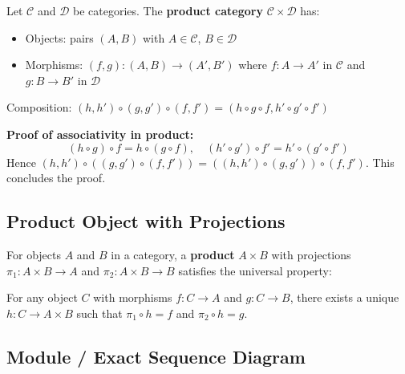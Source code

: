 \documentclass{article}
\begin{document}
Let $\mathcal{C}$ and $\mathcal{D}$ be categories. The \textbf{product category} $\mathcal{C} \times \mathcal{D}$ has:
\begin{itemize}
    \item Objects: pairs $(A, B)$ with $A \in \mathcal{C}$, $B \in \mathcal{D}$
    \item Morphisms: $(f, g) : (A, B) \to (A', B')$ where $f : A \to A'$ in $\mathcal{C}$ and $g : B \to B'$ in $\mathcal{D}$
\end{itemize}

Composition: $(h, h') \circ (g, g') \circ (f, f') = (h \circ g \circ f, h' \circ g' \circ f')$

\begin{center}
\end{center}

\textbf{Proof of associativity in product:}
\[
(h \circ g) \circ f = h \circ (g \circ f), \quad (h' \circ g') \circ f' = h' \circ (g' \circ f')
\]
Hence $(h, h') \circ ((g, g') \circ (f, f')) = ((h, h') \circ (g, g')) \circ (f, f')$. This concludes the proof.

\subsection{Product Object with Projections}

For objects $A$ and $B$ in a category, a \textbf{product} $A \times B$ with projections $\pi_1 : A \times B \to A$ and $\pi_2 : A \times B \to B$ satisfies the universal property:

\begin{center}
\end{center}

For any object $C$ with morphisms $f : C \to A$ and $g : C \to B$, there exists a unique $h : C \to A \times B$ such that $\pi_1 \circ h = f$ and $\pi_2 \circ h = g$.

\subsection{Module / Exact Sequence Diagram}
\end{document}
